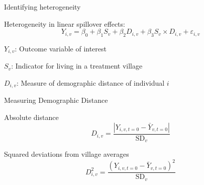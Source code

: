 \documentclass[14pt, aspectratio=169]{beamer}
\newenvironment{wideitemize}{\itemize\addtolength{\itemsep}{10pt}}{\enditemize}
\let\OLDitemize\itemize
\renewcommand\itemize{\OLDitemize\addtolength{\itemsep}{10pt}}
\begin{document}
\begin{frame}{Identifying heterogeneity}
\begin{wideitemize}
	\item Heterogeneity in linear spillover effects:
	\begin{equation*} \label{eq:interaction}
	Y_{i,v} = \beta_0 + \beta_1 S_v + \beta_2 D_{i,v} + \beta_3 S_v \times  D_{i,v} + \varepsilon_{i,v}
	\end{equation*}

	\item $Y_{i,v}$: Outcome variable of interest
    \item $S_v$: Indicator for living in a treatment village
    \item $D_{i,v}$: Measure of demographic distance of individual $i$
 
\end{wideitemize}
\end{frame}

\begin{frame}{Measuring Demographic Distance}
\begin{wideitemize}
	\item Absolute distance
	$$D_{i,v}  = \frac{|Y_{i,v,t=0} - \bar Y_{v,t=0}|}{\text{SD}_v} $$
	\item Squared deviations from village averages
	$$ D^2_{i,v}= \frac{(Y_{i,v,t=0} - \bar Y_{v,t=0})^2}{\text{SD}_v} $$
\end{wideitemize}
\end{frame}
\end{document}
